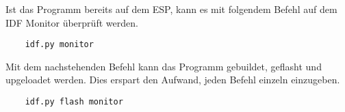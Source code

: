 Ist das Programm bereits auf dem ESP, kann es mit folgendem Befehl auf dem IDF Monitor überprüft werden.

\begin{verbatim}
    idf.py monitor
\end{verbatim}

Mit dem nachstehenden Befehl kann das Programm gebuildet, geflasht und upgeloadet werden. Dies erspart den Aufwand, jeden Befehl einzeln einzugeben.

\begin{verbatim}
    idf.py flash monitor
\end{verbatim}








